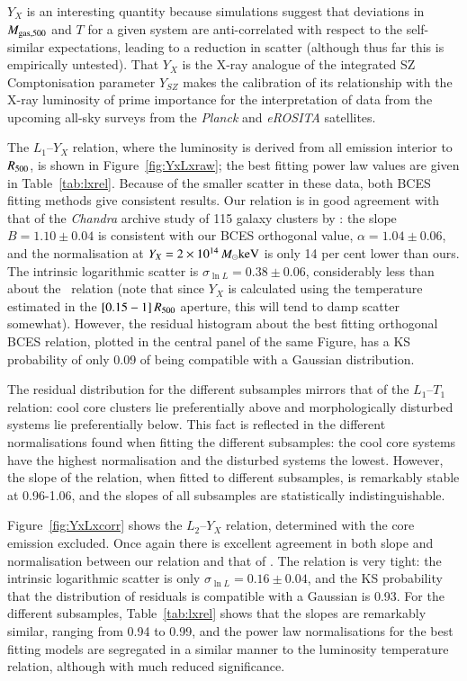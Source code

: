 \documentclass[oldversion]{aa}
\begin{document}
{$Y_X$ is an interesting quantity because simulations suggest that deviations in $M_{\rm gas,500}$ and $T$ for a given system are anti-correlated with respect to the self-similar expectations, leading to a reduction in scatter (although thus far this is empirically untested). That $Y_X$ is the X-ray analogue of the integrated SZ Comptonisation parameter $Y_{SZ}$ makes the calibration of its relationship with the X-ray luminosity of prime importance for the interpretation of data from the upcoming all-sky surveys from the {\it Planck} and {\it eROSITA} satellites.

The $L_1$--$Y_X$ relation, where the luminosity is derived from all emission interior to $R_{500}$, is
shown in Figure~\ref{fig:YxLxraw}; the best fitting power law
values are given in Table~\ref{tab:lxrel}.  Because of the smaller scatter in these data, both BCES fitting
methods give consistent results. Our relation is in
good agreement with that of the {\it Chandra} archive study of
115 galaxy clusters by \citet{maughan07}: the slope
$B=1.10\pm0.04$ is consistent with our BCES orthogonal value, $\alpha=1.04\pm0.06$,
and the normalisation at $Y_X=2\times10^{14}\,M_\odot\rm keV$ is only 14 per cent lower than ours. The intrinsic logarithmic scatter is $\sigma_{\ln{L}} = 0.38\pm0.06$, considerably less than about the \LxT\ relation (note that since $Y_X$ is calculated using the temperature estimated in the $[0.15-1]\,R_{500}$ aperture, this will tend to damp scatter somewhat). However, the residual histogram about the best fitting orthogonal BCES relation, plotted in the central panel of the same Figure, has a KS probability of only 0.09 of being compatible with a Gaussian distribution.

The residual distribution for the different subsamples mirrors that of
the $L_1$--$T_1$ relation: cool core clusters lie preferentially above and
morphologically disturbed systems lie preferentially below. This fact
is reflected in the different normalisations found when fitting the
different subsamples: the cool core systems have the highest normalisation and the disturbed systems the lowest. However, the slope
of the relation, when fitted to different subsamples, is remarkably
stable at 0.96-1.06, and the slopes of all subsamples are statistically
indistinguishable.

Figure~\ref{fig:YxLxcorr} shows the $L_2$--$Y_X$ relation, determined with
the core emission excluded. Once again there is excellent agreement in
both slope and normalisation between our relation and that of
\citet{maughan07}. The relation is very tight: the intrinsic logarithmic scatter is only $\sigma_{\ln{L}} = 0.16\pm0.04$, and the KS probability that the distribution of residuals is compatible with a Gaussian is 0.93. For the different subsamples, Table~\ref{tab:lxrel} shows that the slopes are remarkably similar, ranging from 0.94 to 0.99, and the power law normalisations for the best fitting models are segregated in a similar manner to the luminosity
temperature relation, although with much reduced significance. 

}
\end{document}
